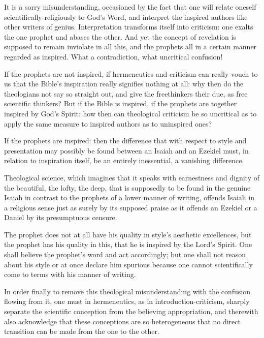 \documentclass[12pt,a4paper]{book}
\begin{document}
It is a sorry misunderstanding, occasioned by the fact that one will relate oneself
scientifically-religiously to God's Word, and interpret the inspired authors like
other writers of genius. Interpretation transforms itself into criticism: one exalts
the one prophet and abases the other. And yet the concept of revelation is supposed
to remain inviolate in all this, and the prophets all in a certain manner regarded as
inspired. What a contradiction, what uncritical confusion!

If the prophets are not inspired, if hermeneutics and criticism can really vouch to
us that the Bible's inspiration really signifies nothing at all: why then do the
theologians not say so straight out, and give the freethinkers their due, as free
scientific thinkers? But if the Bible is inspired, if the prophets are together
inspired by God's Spirit: how then can theological criticism be so uncritical as to
apply the same measure to inspired authors as to uninspired ones?

If the prophets are inspired: then the difference that with respect to style and
presentation may possibly be found between an Isaiah and an Ezekiel must, in relation
to inspiration itself, be an entirely inessential, a vanishing difference.

Theological science, which imagines that it speaks with earnestness and dignity of
the beautiful, the lofty, the deep, that is supposedly to be found in the genuine
Isaiah in contrast to the prophets of a lower manner of writing, offends Isaiah in a
religious sense just as surely by its supposed praise as it offends an Ezekiel or a
Daniel by its presumptuous censure.

The prophet does not at all have his quality in style's aesthetic excellences, but
the prophet has his quality in this, that he is inspired by the Lord's Spirit. One
shall believe the prophet's word and act accordingly; but one shall not reason about
his style or at once declare him spurious because one cannot scientifically come to
terms with his manner of writing.

In order finally to remove this theological misunderstanding with the confusion
flowing from it, one must in hermeneutics, as in introduction-criticism, sharply
separate the scientific conception from the believing appropriation, and therewith
also acknowledge that these conceptions are so heterogeneous that no direct
transition can be made from the one to the other.
\end{document}
